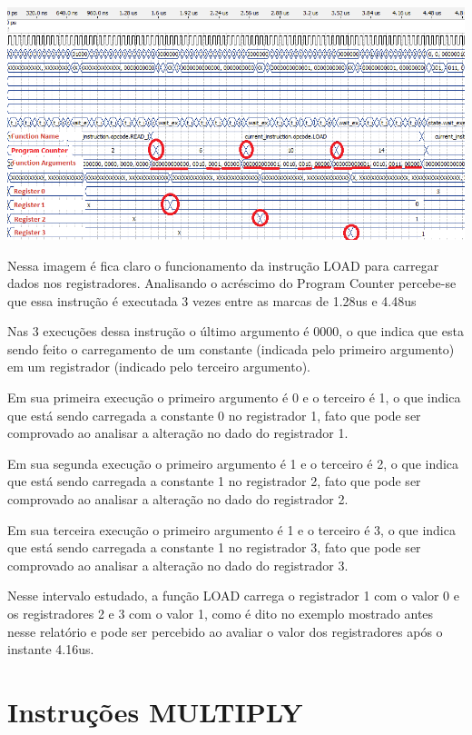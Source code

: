 \documentclass[11pt]{report}
\begin{document}
\includegraphics[width=\textwidth]{load}

Nessa imagem é fica claro o funcionamento da instrução LOAD para carregar dados nos registradores. Analisando o acréscimo do Program Counter percebe-se que essa instrução é executada 3 vezes entre as marcas de 1.28us e 4.48us

Nas 3 execuções dessa instrução o último argumento é 0000, o que indica que esta sendo feito o carregamento de um constante (indicada pelo primeiro argumento) em um registrador (indicado pelo terceiro argumento).

Em sua primeira execução o primeiro argumento é 0 e o terceiro é 1, o que indica que está sendo carregada a constante 0 no registrador 1, fato que pode ser comprovado ao analisar a alteração no dado do registrador 1.

Em sua segunda execução o primeiro argumento é 1 e o terceiro é 2, o que indica que está sendo carregada a constante 1 no registrador 2, fato que pode ser comprovado ao analisar a alteração no dado do registrador 2.

Em sua terceira execução o primeiro argumento é 1 e o terceiro é 3, o que indica que está sendo carregada a constante 1 no registrador 3, fato que pode ser comprovado ao analisar a alteração no dado do registrador 3.

Nesse intervalo estudado, a função LOAD carrega o registrador 1 com o valor 0 e os registradores 2 e 3 com o valor 1, como é dito no exemplo mostrado antes nesse relatório e pode ser percebido ao avaliar o valor dos registradores após o instante 4.16us.

\section{Instruções MULTIPLY}
\end{document}
